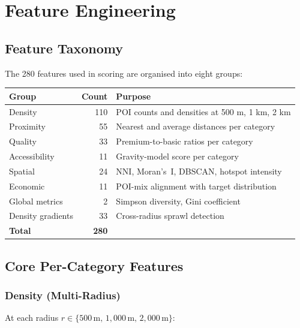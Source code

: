 \documentclass[11pt,a4paper]{article}
\begin{document}
\section{Feature Engineering}

\subsection{Feature Taxonomy}

The 280 features used in scoring are organised into eight groups:

\begin{center}
\begin{tabular}{@{}lrl@{}}
\toprule
\textbf{Group} & \textbf{Count} & \textbf{Purpose} \\ \midrule
Density          & 110 & POI counts and densities at 500 m, 1 km, 2 km \\
Proximity        & 55  & Nearest and average distances per category \\
Quality          & 33  & Premium-to-basic ratios per category \\
Accessibility    & 11  & Gravity-model score per category \\
Spatial          & 24  & NNI, Moran's~I, DBSCAN, hotspot intensity \\
Economic         & 11  & POI-mix alignment with target distribution \\
Global metrics   & 2   & Simpson diversity, Gini coefficient \\
Density gradients& 33  & Cross-radius sprawl detection \\ \midrule
\textbf{Total}   & \textbf{280} & \\ \bottomrule
\end{tabular}
\end{center}

\subsection{Core Per-Category Features}

\subsubsection{Density (Multi-Radius)}

At each radius $r \in \{500\,\text{m},\,1{,}000\,\text{m},\,2{,}000\,\text{m}\}$:
\end{document}
